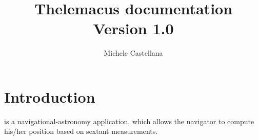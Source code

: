 \documentclass[]{book}
\title{Thelemacus documentation\\
\large{Version 1.0}}
\author{Michele Castellana}
\newcommand{\mycaption}[2]{\caption[#1]{\textbf{#1}. #2}}
\begin{document}
 

\maketitle 

\pagebreak
\tableofcontents

\chapter{Introduction}

\thel  is a navigational-astronomy application, which allows the navigator to compute his/her position based on sextant measurements. 



\printacronyms[pages={display=none,seq/use=false}]




\end{document}
